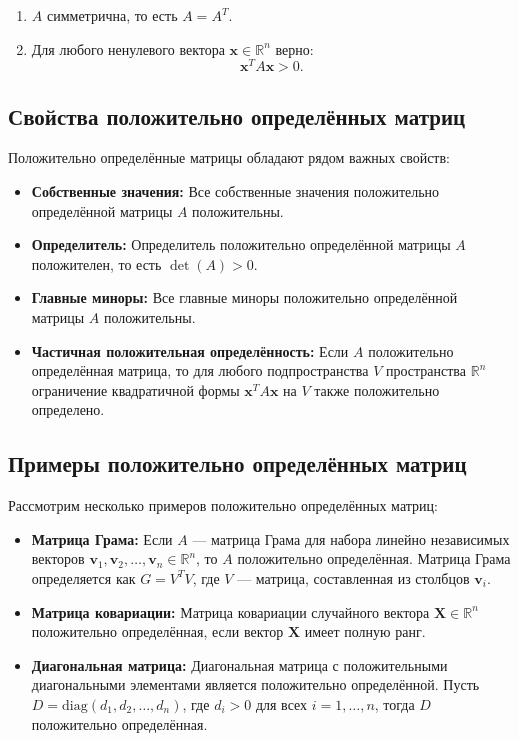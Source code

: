 \documentclass{article}
\begin{document}
\begin{enumerate}
    \item $A$ симметрична, то есть $A = A^T$.
    \item Для любого ненулевого вектора $\mathbf{x} \in \mathbb{R}^n$ верно:
    \[
    \mathbf{x}^T A \mathbf{x} > 0.
    \]
\end{enumerate}

\subsection{Свойства положительно определённых матриц}

Положительно определённые матрицы обладают рядом важных свойств:

\begin{itemize}
    \item \textbf{Собственные значения:} Все собственные значения положительно определённой матрицы $A$ положительны.
    
    \item \textbf{Определитель:} Определитель положительно определённой матрицы $A$ положителен, то есть $\det(A) > 0$.
    
    \item \textbf{Главные миноры:} Все главные миноры положительно определённой матрицы $A$ положительны.
    
    \item \textbf{Частичная положительная определённость:} Если $A$ положительно определённая матрица, то для любого подпространства $V$ пространства $\mathbb{R}^n$ ограничение квадратичной формы $\mathbf{x}^T A \mathbf{x}$ на $V$ также положительно определено.
\end{itemize}

\subsection{Примеры положительно определённых матриц}

Рассмотрим несколько примеров положительно определённых матриц:

\begin{itemize}
    \item \textbf{Матрица Грама:} Если $A$ — матрица Грама для набора линейно независимых векторов $\mathbf{v}_1, \mathbf{v}_2, \ldots, \mathbf{v}_n \in \mathbb{R}^n$, то $A$ положительно определённая. Матрица Грама определяется как $G = V^T V$, где $V$ — матрица, составленная из столбцов $\mathbf{v}_i$.
    
    \item \textbf{Матрица ковариации:} Матрица ковариации случайного вектора $\mathbf{X} \in \mathbb{R}^n$ положительно определённая, если вектор $\mathbf{X}$ имеет полную ранг.
    
    \item \textbf{Диагональная матрица:} Диагональная матрица с положительными диагональными элементами является положительно определённой. Пусть $D = \text{diag}(d_1, d_2, \ldots, d_n)$, где $d_i > 0$ для всех $i = 1, \ldots, n$, тогда $D$ положительно определённая.
\end{itemize}
\end{document}
